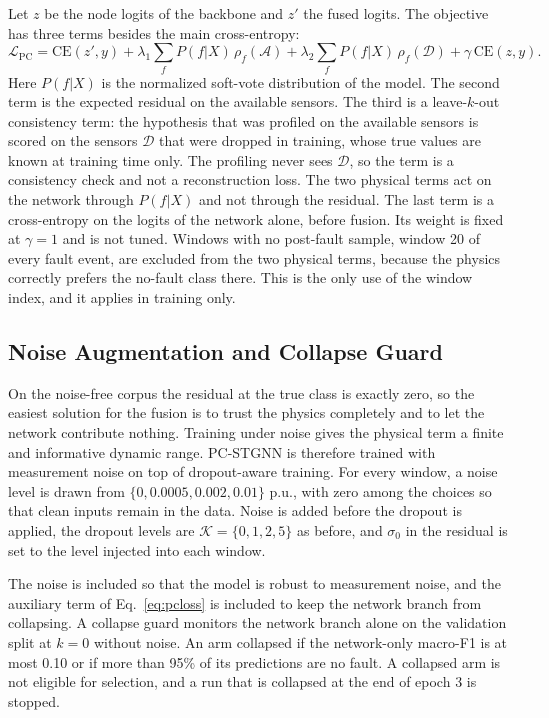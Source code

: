 \documentclass[MTech]{ugthesis}
\begin{document}
Let $z$ be the node logits of the backbone and $z'$ the fused logits. The objective has three terms besides the main cross-entropy:
\begin{equation}
\mathcal{L}_{\mathrm{PC}}=\mathrm{CE}(z',y)+\lambda_1\sum_{f}P(f|X)\,\rho_f(\mathcal{A})+\lambda_2\sum_{f}P(f|X)\,\rho_f(\mathcal{D})+\gamma\,\mathrm{CE}(z,y).
\label{eq:pcloss}
\end{equation}
Here $P(f|X)$ is the normalized soft-vote distribution of the model. The second term is the expected residual on the available sensors. The third is a leave-$k$-out consistency term: the hypothesis that was profiled on the available sensors is scored on the sensors $\mathcal{D}$ that were dropped in training, whose true values are known at training time only. The profiling never sees $\mathcal{D}$, so the term is a consistency check and not a reconstruction loss. The two physical terms act on the network through $P(f|X)$ and not through the residual. The last term is a cross-entropy on the logits of the network alone, before fusion. Its weight is fixed at $\gamma=1$ and is not tuned. Windows with no post-fault sample, window 20 of every fault event, are excluded from the two physical terms, because the physics correctly prefers the no-fault class there. This is the only use of the window index, and it applies in training only.

\subsection{Noise Augmentation and Collapse Guard}

On the noise-free corpus the residual at the true class is exactly zero, so the easiest solution for the fusion is to trust the physics completely and to let the network contribute nothing. Training under noise gives the physical term a finite and informative dynamic range. PC-STGNN is therefore trained with measurement noise on top of dropout-aware training. For every window, a noise level is drawn from $\{0,0.0005,0.002,0.01\}$ p.u., with zero among the choices so that clean inputs remain in the data. Noise is added before the dropout is applied, the dropout levels are $\mathcal{K}=\{0,1,2,5\}$ as before, and $\sigma_0$ in the residual is set to the level injected into each window.

The noise is included so that the model is robust to measurement noise, and the auxiliary term of Eq.~\eqref{eq:pcloss} is included to keep the network branch from collapsing. A collapse guard monitors the network branch alone on the validation split at $k=0$ without noise. An arm collapsed if the network-only macro-F1 is at most 0.10 or if more than 95\% of its predictions are no fault. A collapsed arm is not eligible for selection, and a run that is collapsed at the end of epoch 3 is stopped.
\end{document}

